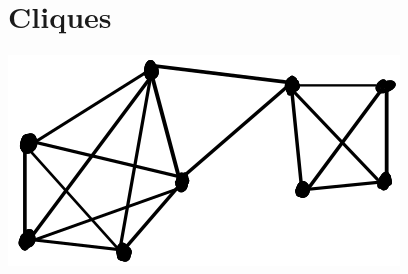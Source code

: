 \documentclass[12pt]{article}
\begin{document}
\section*{Cliques}

    \begin{center} \includegraphics[scale=1.4]{fig13.png} \end{center}

\newpage
\end{document}
